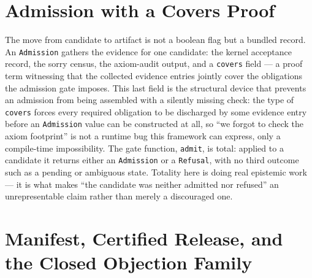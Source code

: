 \section{Admission with a Covers Proof}
\label{sec:mfact-admission}

The move from candidate to artifact is not a boolean flag but a bundled
record. An \texttt{Admission} gathers the evidence for one candidate:
the kernel acceptance record, the sorry census, the axiom-audit output,
and a \texttt{covers} field --- a proof term witnessing that the
collected evidence entries jointly cover the obligations the admission
gate imposes. This last field is the structural device that prevents an
admission from being assembled with a silently missing check: the type
of \texttt{covers} forces every required obligation to be discharged by
some evidence entry before an \texttt{Admission} value can be
constructed at all, so ``we forgot to check the axiom footprint'' is not
a runtime bug this framework can express, only a compile-time
impossibility. The gate function, \texttt{admit}, is total: applied to a
candidate it returns either an \texttt{Admission} or a \texttt{Refusal},
with no third outcome such as a pending or ambiguous state. Totality
here is doing real epistemic work --- it is what makes ``the candidate
was neither admitted nor refused'' an unrepresentable claim rather than
merely a discouraged one.

\section{Manifest, Certified Release, and the Closed Objection Family}
\label{sec:mfact-manifest}

